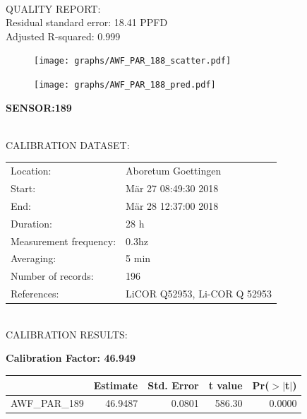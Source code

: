 \documentclass[oneside]{report}
\begin{document}
\hrulefill\\
QUALITY REPORT:\\
Residual standard error: 18.41 PPFD\\
Adjusted R-squared: 0.999



\begin{figure}[H]
  \centering
  \texttt{[image: graphs/AWF\_PAR\_188\_scatter.pdf]}
\end{figure}




\begin{figure}[H]
  \centering
  \texttt{[image: graphs/AWF\_PAR\_188\_pred.pdf]}
\end{figure}

\pagebreak


\begin{center}
\large{\textbf{SENSOR:189}}\\
\end{center}

\hrulefill\\
CALIBRATION DATASET:\\
\begin{table}[h!]
  \centering
  \label{tab:table1}
  \begin{tabular}{ll}
    Location: & Aboretum Goettingen\\ 
    
    
    Start:  & Mär 27 08:49:30 2018 \\
    End:   & Mär 28 12:37:00 2018\\ 
    Duration: & 28 h\\
    Measurement frequency: & 0.3hz\\
    Averaging:  &5 min\\
    Number of records: & 196 \\
    References: & LiCOR Q52953, Li-COR Q 52953 \\
  \end{tabular}
\end{table}

\hrulefill\\
CALIBRATION RESULTS:\\


\begin{center}
\textbf{\large{Calibration Factor: 46.949}}\\
\end{center}
\begin{table}[ht]
\centering
\begin{tabular}{rrrrr}
  \hline
 & Estimate & Std. Error & t value & Pr($>$$|$t$|$) \\ 
  \hline
AWF\_PAR\_189 & 46.9487 & 0.0801 & 586.30 & 0.0000 \\ 
   \hline
\end{tabular}
\end{table}
\end{document}
